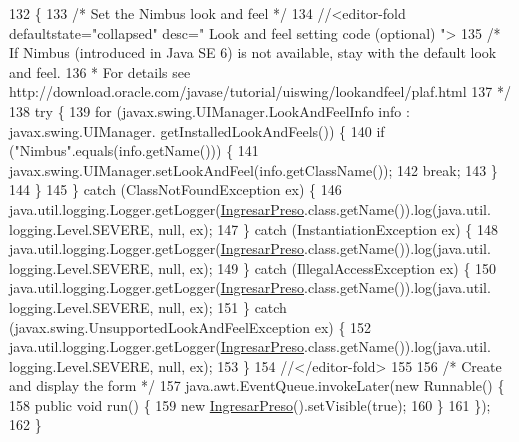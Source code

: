 \begin{DoxyCode}
132                                            \{
133         \textcolor{comment}{/* Set the Nimbus look and feel */}
134         \textcolor{comment}{//<editor-fold defaultstate="collapsed" desc=" Look and feel setting code (optional) ">}
135         \textcolor{comment}{/* If Nimbus (introduced in Java SE 6) is not available, stay with the default look and feel.}
136 \textcolor{comment}{         * For details see http://download.oracle.com/javase/tutorial/uiswing/lookandfeel/plaf.html }
137 \textcolor{comment}{         */}
138         \textcolor{keywordflow}{try} \{
139             \textcolor{keywordflow}{for} (javax.swing.UIManager.LookAndFeelInfo info : javax.swing.UIManager.
      getInstalledLookAndFeels()) \{
140                 \textcolor{keywordflow}{if} (\textcolor{stringliteral}{"Nimbus"}.equals(info.getName())) \{
141                     javax.swing.UIManager.setLookAndFeel(info.getClassName());
142                     \textcolor{keywordflow}{break};
143                 \}
144             \}
145         \} \textcolor{keywordflow}{catch} (ClassNotFoundException ex) \{
146             java.util.logging.Logger.getLogger(\mbox{\hyperlink{classsoftware_1_1_ingresar_preso_a565b73716f68bd3fa7126be93b8cb60b}{IngresarPreso}}.class.getName()).log(java.util.
      logging.Level.SEVERE, null, ex);
147         \} \textcolor{keywordflow}{catch} (InstantiationException ex) \{
148             java.util.logging.Logger.getLogger(\mbox{\hyperlink{classsoftware_1_1_ingresar_preso_a565b73716f68bd3fa7126be93b8cb60b}{IngresarPreso}}.class.getName()).log(java.util.
      logging.Level.SEVERE, null, ex);
149         \} \textcolor{keywordflow}{catch} (IllegalAccessException ex) \{
150             java.util.logging.Logger.getLogger(\mbox{\hyperlink{classsoftware_1_1_ingresar_preso_a565b73716f68bd3fa7126be93b8cb60b}{IngresarPreso}}.class.getName()).log(java.util.
      logging.Level.SEVERE, null, ex);
151         \} \textcolor{keywordflow}{catch} (javax.swing.UnsupportedLookAndFeelException ex) \{
152             java.util.logging.Logger.getLogger(\mbox{\hyperlink{classsoftware_1_1_ingresar_preso_a565b73716f68bd3fa7126be93b8cb60b}{IngresarPreso}}.class.getName()).log(java.util.
      logging.Level.SEVERE, null, ex);
153         \}
154         \textcolor{comment}{//</editor-fold>}
155 
156         \textcolor{comment}{/* Create and display the form */}
157         java.awt.EventQueue.invokeLater(\textcolor{keyword}{new} Runnable() \{
158             \textcolor{keyword}{public} \textcolor{keywordtype}{void} run() \{
159                 \textcolor{keyword}{new} \mbox{\hyperlink{classsoftware_1_1_ingresar_preso_a565b73716f68bd3fa7126be93b8cb60b}{IngresarPreso}}().setVisible(\textcolor{keyword}{true});
160             \}
161         \});
162     \}
\end{DoxyCode}


